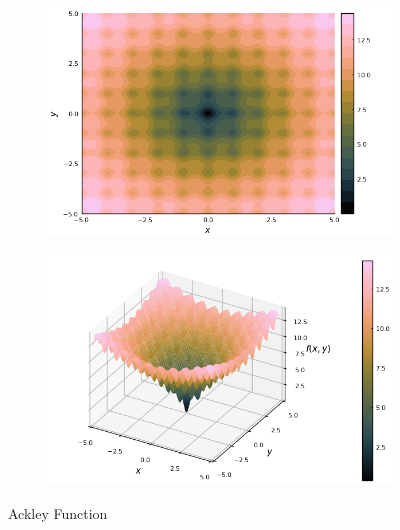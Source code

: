   \begin{figure}[ht!]
  \centering
  \begin{subfigure}[b]{0.4\textwidth}
    \centering
    \includegraphics[width=\textwidth]{img/test_functions/ackley_contour.png}
  \end{subfigure}
  \begin{subfigure}[b]{0.4\textwidth}
    \centering
    \includegraphics[width=\textwidth]{img/test_functions/ackley_surface.png}
  \end{subfigure}
  \caption{Ackley Function}
  \label{fig:app:test:ackley}
  \end{figure}
